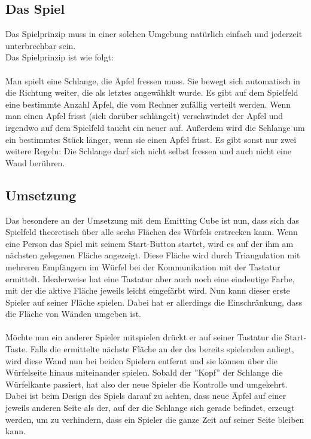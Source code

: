 \documentclass[pdftex,12pt,a4paper]{report}
\begin{document}
\subsection{Das Spiel}
Das Spielprinzip muss in einer solchen Umgebung natürlich einfach und jederzeit unterbrechbar sein.\\
Das Spielprinzip ist wie folgt:\\
\\
Man spielt eine Schlange, die Äpfel fressen muss. Sie bewegt sich automatisch in die Richtung weiter, die als letztes angewähklt wurde.
Es gibt auf dem Spielfeld eine bestimmte Anzahl Äpfel, die vom Rechner zufällig verteilt werden.
Wenn man einen Apfel frisst (sich darüber schlängelt) verschwindet der Apfel und irgendwo auf dem Spielfeld taucht ein neuer auf.
Außerdem wird die Schlange um ein bestimmtes Stück länger, wenn sie einen Apfel frisst.
Es gibt sonst nur zwei weitere Regeln: Die Schlange darf sich nicht selbst fressen und auch nicht eine Wand berühren.

\subsection{Umsetzung}
Das besondere an der Umsetzung mit dem Emitting Cube ist nun, dass sich das Spielfeld theoretisch über alle sechs Flächen des Würfels erstrecken kann.
Wenn eine Person das Spiel mit seinem Start-Button startet, wird es auf der ihm am nächsten gelegenen Fläche angezeigt.
Diese Fläche wird durch Triangulation mit mehreren Empfängern im Würfel bei der Kommunikation mit der Tastatur ermittelt.
Idealerweise hat eine Tastatur aber auch noch eine eindeutige Farbe, mit der die aktive Fläche jeweils leicht eingefärbt wird.
Nun kann dieser erste Spieler auf seiner Fläche spielen.
Dabei hat er allerdings die Einschränkung, dass die Fläche von Wänden umgeben ist.\\
\\
Möchte nun ein anderer Spieler mitspielen drückt er auf seiner Tastatur die Start-Taste.
Falls die ermittelte nächste Fläche an der des bereits spielenden anliegt, wird diese Wand nun bei beiden Spielern entfernt und sie können über die Würfelseite hinaus miteinander spielen.
Sobald der ''Kopf'' der Schlange die Würfelkante passiert, hat also der neue Spieler die Kontrolle und umgekehrt.
Dabei ist beim Design des Spiels darauf zu achten, dass neue Äpfel auf einer jeweils anderen Seite als der, 
auf der die Schlange sich gerade befindet, erzeugt werden, um zu verhindern, dass ein Spieler die ganze Zeit auf seiner Seite bleiben kann.
\end{document}
